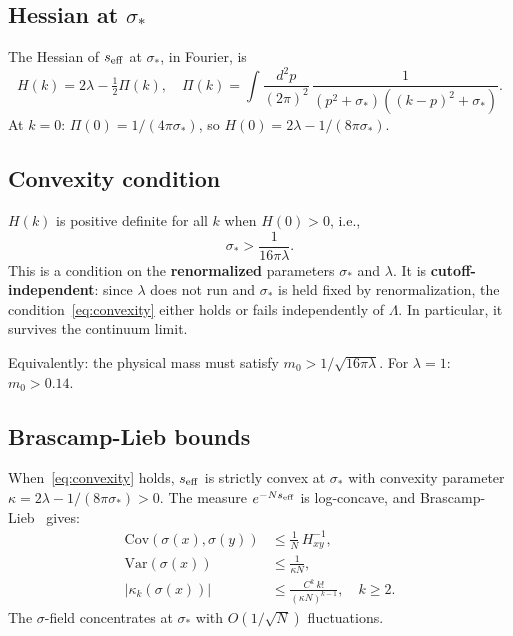 \documentclass[12pt]{article}
\theoremstyle{definition}
\theoremstyle{remark}
\newcommand{\Var}{\mathrm{Var}}
\newcommand{\Cov}{\mathrm{Cov}}
\begin{document}
\subsection{Hessian at $\sigma_*$}

The Hessian of $s_{\rm eff}$ at $\sigma_*$, in Fourier, is
\begin{equation}
  H(k) = 2\lambda - \tfrac{1}{2}\Pi(k),
  \quad
  \Pi(k) = \int\!\frac{d^2p}{(2\pi)^2}\,
    \frac{1}{(p^2+\sigma_*)((k-p)^2+\sigma_*)}.
\end{equation}
At $k=0$: $\Pi(0) = 1/(4\pi\sigma_*)$, so
$H(0) = 2\lambda - 1/(8\pi\sigma_*)$.

\subsection{Convexity condition}

$H(k)$ is positive definite for all $k$ when $H(0)>0$, i.e.,
\begin{equation}
\label{eq:convexity}
  \boxed{\sigma_* > \frac{1}{16\pi\lambda}.}
\end{equation}
This is a condition on the \textbf{renormalized} parameters
$\sigma_*$ and $\lambda$. It is \textbf{cutoff-independent}: since
$\lambda$ does not run and $\sigma_*$ is held fixed by renormalization,
the condition~\eqref{eq:convexity} either holds or fails independently
of $\Lambda$. In particular, it survives the continuum limit.

Equivalently: the physical mass must satisfy
$m_0 > 1/\sqrt{16\pi\lambda}$. For $\lambda = 1$: $m_0 > 0.14$.

\subsection{Brascamp-Lieb bounds}

When~\eqref{eq:convexity} holds, $s_{\rm eff}$ is strictly convex
at $\sigma_*$ with convexity parameter
$\kappa = 2\lambda - 1/(8\pi\sigma_*) > 0$. The measure
$e^{-Ns_{\rm eff}}$ is log-concave, and Brascamp-Lieb~\cite{BL76}
gives:
\begin{align}
  \Cov(\sigma(x),\sigma(y)) &\le \frac{1}{N}\,H^{-1}_{xy}, \\
  \Var(\sigma(x)) &\le \frac{1}{\kappa N}, \\
  |\kappa_k(\sigma(x))| &\le \frac{C^k\,k!}{(\kappa N)^{k-1}},
    \quad k\ge 2.
\end{align}
The $\sigma$-field concentrates at $\sigma_*$ with $O(1/\sqrt{N})$
fluctuations.
\end{document}

